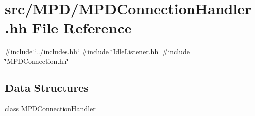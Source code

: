 \hypertarget{MPDConnectionHandler_8hh}{
\section{src/\-M\-P\-D/\-M\-P\-D\-Connection\-Handler.hh \-File \-Reference}
\label{MPDConnectionHandler_8hh}
}
{\ttfamily \#include \char`\"{}../includes.\-hh\char`\"{}}\*
{\ttfamily \#include \char`\"{}\-Idle\-Listener.\-hh\char`\"{}}\*
{\ttfamily \#include \char`\"{}\-M\-P\-D\-Connection.\-hh\char`\"{}}\*
\subsection*{\-Data \-Structures}
\begin{DoxyCompactItemize}
\item 
class \hyperlink{classMPDConnectionHandler}{\-M\-P\-D\-Connection\-Handler}
\end{DoxyCompactItemize}
